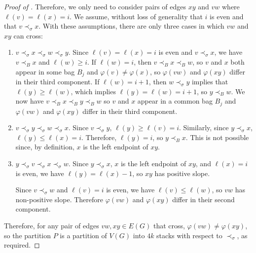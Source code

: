 \documentclass{patmorin}
\begin{document}
\begin{proof}[Proof of ]
  Therefore, we only need to consider pairs of edges $xy$ and $vw$ where $\ell(v)=\ell(x)=i$. We assume, without loss of generality that $i$ is even
  and that $v\prec_\sigma x$.  With these assumptions, there are only three cases in which $vw$ and $xy$ can cross:
  \begin{enumerate}
    \item $v\prec_\sigma x\prec_\sigma w\prec_\sigma y$. Since $\ell(v)=\ell(x)=i$ is even and $v\prec_\sigma x$, we have $v\prec_B x$ and $\ell(w)\ge i$.  If $\ell(w)=i$, then $v\prec_B x\prec_B w$, so $v$ and $x$ both appear in some bag $B_j$ and $\varphi(v)\neq\varphi(x)$, so $\varphi(vw)$ and $\varphi(xy)$ differ in their third component.  If $\ell(w)=i+1$, then $w\prec_\sigma y$ implies that $\ell(y)\ge\ell(w)$, which implies $\ell(y)=\ell(w)=i+1$, so $y\prec_B w$.  We now have $v\prec_B x\prec_B y\prec_B w$ so $v$ and $x$ appear in a common bag $B_j$ and $\varphi(vw)$ and $\varphi(xy)$ differ in their third component.  
    
    \item $v\prec_\sigma y\prec_\sigma w\prec_\sigma x$.  Since $v\prec_\sigma y$, $\ell(y)\ge \ell(v)=i$.  Similarly, since $y\prec_\sigma x$, $\ell(y)\le\ell(x)=i$.  Therefore, $\ell(y)=i$, so $y\prec_B x$.  This is not possible since, by definition, $x$ is the left endpoint of $xy$.

    \item $y\prec_\sigma v\prec_\sigma x\prec_\sigma w$.  Since $y\prec_\sigma x$, $x$ is the left endpoint of $xy$, and $\ell(x)=i$ is even, we have $\ell(y)=\ell(x)-1$, so $xy$ has positive slope.  
    
    Since $v\prec_\sigma w$ and $\ell(v)=i$ is even, we have $\ell(v)\le\ell(w)$, so $vw$ has non-positive slope.  Therefore $\varphi(vw)$ and $\varphi(xy)$ differ in their second component.
  \end{enumerate}
  Therefore, for any pair of edges $vw,xy\in E(G)$ that cross, $\varphi(vw)\neq\varphi(xy)$, so the partition $P$ is a partition of $V(G)$ into $4k$ stacks with respect to $\prec_\sigma$, as required.
\end{proof}
\end{document}
